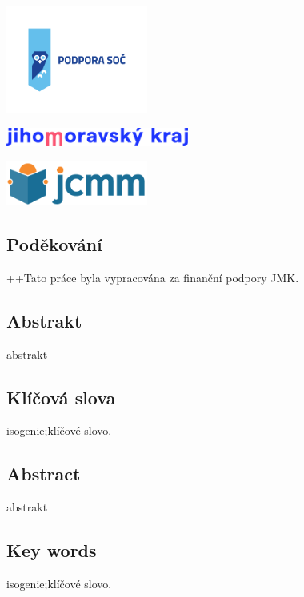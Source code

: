 \documentclass [12pt]{report}
\begin{document}
\newpage
\thispagestyle{empty}
\begin{center}
\includegraphics[width=0.35\textwidth]{podpora_soc-horizontalni.png}
\end{center}
\vspace*{1.5cm}
\begin{center}
\includegraphics[width=0.45\textwidth]{logo_JMK_pruhledne.png}
\end{center}
\vspace*{2.2cm}
\begin{center}
\includegraphics[width=0.35\textwidth]{jcmm-logotype-positive1.png}
\end{center}
\vspace*{6.5cm}
\subsection*{Poděkování}
++Tato práce byla vypracována za finanční podpory JMK.


\newpage
\thispagestyle{empty}
\subsection*{Abstrakt}
abstrakt


\subsection*{Klíčová slova}
isogenie;klíčové slovo.


\vspace*{4cm}

\subsection*{Abstract}
abstrakt

\subsection*{Key words}
isogenie;klíčové slovo.
\end{document}
